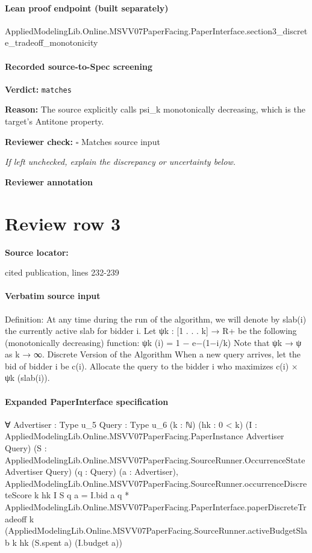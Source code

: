 \documentclass[10pt]{article}
\newcommand{\reviewerbox}{%
  \par\noindent\fbox{\parbox{0.96\linewidth}{\rule{0pt}{0.38in}}}\par
}
\newcommand{\reviewmatch}[1]{%
  \par\noindent\textbf{Reviewer check:} $\square$\; #1\par
  \noindent\emph{If left unchecked, explain the discrepancy or uncertainty below.}\par
}
\begin{document}
\paragraph{Lean proof endpoint (built separately)}\begin{ReviewVerbatim}
AppliedModelingLib.Online.MSVV07PaperFacing.PaperInterface.section3_discrete_tradeoff_monotonicity
\end{ReviewVerbatim}

\paragraph{Recorded source-to-Spec screening}
\textbf{Verdict:} \texttt{matches}
\\
{\raggedright
\textbf{Reason:} The source explicitly calls psi\_\allowbreak{}k monotonically decreasing, which is the target's Antitone property.\allowbreak{}
\par}
\reviewmatch{Matches source input}
\noindent\textbf{Reviewer annotation}\par
\reviewerbox
\clearpage
\hypertarget{source-claim-aed83fc3d3c0c45a}{}
\section*{Review row 3}
\textbf{Source locator:} {\footnotesize\raggedright cited publication, lines 232-\allowbreak{}239\par}
\paragraph{Verbatim source input}
\begin{ReviewVerbatim}
Definition: At any time during the run of the algorithm, we will denote by slab(i) the
currently active slab for bidder i.
Let ψk : [1 . . . k] → R+ be the following (monotonically decreasing) function:
ψk (i) = 1 − e−(1−i/k)
Note that ψk → ψ as k → ∞.
Discrete Version of the Algorithm
When a new query arrives, let the bid of bidder i be c(i). Allocate the query to the
bidder i who maximizes c(i) × ψk (slab(i)).
\end{ReviewVerbatim}



\paragraph{Expanded PaperInterface specification}
\begin{ReviewVerbatim}
∀ {Advertiser : Type u_5} {Query : Type u_6} (k : ℕ) (hk : 0 < k)
  (I : AppliedModelingLib.Online.MSVV07PaperFacing.PaperInstance Advertiser Query)
  (S : AppliedModelingLib.Online.MSVV07PaperFacing.SourceRunner.OccurrenceState Advertiser Query) (q : Query)
  (a : Advertiser),
  AppliedModelingLib.Online.MSVV07PaperFacing.SourceRunner.occurrenceDiscreteScore k hk I S q a =
    I.bid a q *
      AppliedModelingLib.Online.MSVV07PaperFacing.PaperInterface.paperDiscreteTradeoff k
        (AppliedModelingLib.Online.MSVV07PaperFacing.SourceRunner.activeBudgetSlab k hk (S.spent a) (I.budget a))
\end{ReviewVerbatim}
\end{document}
